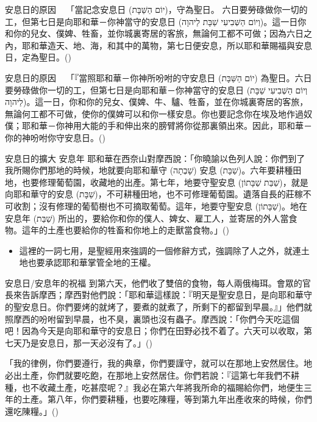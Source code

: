 \documentclass{beamer}
\newcommand{\parvspace}{\par\vspace{0.5em}}
\begin{document}
\begin{frame}{安息日的原因 \textemdash\ }
  「當記念安息日 (\texthebrew{יוֹם הַשַּׁבָּת})，守為聖日。 六日要勞碌做你一切的工，\alert{但第七日是向耶和華－你神當守的安息日 (\texthebrew{וְיוֹם הַשְּׁבִיעִי שַׁבָּת לַיהוָה})}。這一日你和你的兒女、僕婢、牲畜，並你城裏寄居的客旅，無論何工都不可做；因為\alert{六日之內，耶和華造天、地、海，和其中的萬物，第七日便安息，所以耶和華賜福與安息日，定為聖日}。()\parvspace
\end{frame}

\begin{frame}{安息日的原因 \textemdash\ }
  「『當照耶和華－你神所吩咐的守安息日 (\texthebrew{יוֹם הַשַּׁבָּת}) 為聖日。六日要勞碌做你一切的工，\alert{但第七日是向耶和華－你神當守的安息日 (\texthebrew{וְיוֹם הַשְּׁבִיעִי שַׁבָּת לַיהוָה})}。這一日，你和你的兒女、僕婢、牛、驢、牲畜，並在你城裏寄居的客旅，無論何工都不可做，使你的僕婢可以和你一樣安息。\alert{你也要記念你在埃及地作過奴僕；耶和華－你神用大能的手和伸出來的膀臂將你從那裏領出來。因此，耶和華－你的神吩咐你守安息日}。()\parvspace
\end{frame}

\begin{frame}{安息日的擴大 \textemdash 安息年}
  耶和華在西奈山對摩西說：「你曉諭以色列人說：你們到了我所賜你們那地的時候，地就要向耶和華\alert{守 (\texthebrew{שָׁבְתָה}) 安息 (\texthebrew{שַׁבָּת})}。六年要耕種田地，也要修理葡萄園，收藏地的出產。第七年，地要守\alert{聖安息 (\texthebrew{שַׁבַּת שַׁבָּתוֹן})}，就是向耶和華守的\alert{安息 (\texthebrew{שַׁבָּת})}，不可耕種田地，也不可修理葡萄園。遺落自長的莊稼不可收割；沒有修理的葡萄樹也不可摘取葡萄。這年，地要守\alert{聖安息 (\texthebrew{שַׁבָּתוֹן})}。地在\alert{安息年 (\texthebrew{שַׁבַּת})} 所出的，要給你和你的僕人、婢女、雇工人，並寄居的外人當食物。這年的土產也要給你的牲畜和你地上的走獸當食物。」()\parvspace
  \begin{itemize}
    \item
      這裡的\alert{一詞七用}，是聖經用來強調的一個修辭方式，強調\alert{除了人之外，就連土地也要承認耶和華掌管全地的王權}。\parencite{安息年}
  \end{itemize}
\end{frame}

\begin{frame}{安息日/安息年的祝福}
  \alert{到第六天，他們收了雙倍的食物，每人兩俄梅珥}。會眾的官長來告訴摩西；摩西對他們說：「耶和華這樣說：『明天是聖安息日，是向耶和華守的聖安息日。你們要烤的就烤了，要煮的就煮了，所剩下的都留到早晨。』」他們就照摩西的吩咐留到早晨，也不臭，裏頭也沒有蟲子。摩西說：「你們今天吃這個吧！因為今天是向耶和華守的安息日；你們在田野必找不着了。六天可以收取，第七天乃是安息日，那一天必沒有了。」()\parvspace
  「我的律例，你們要遵行，我的典章，你們要謹守，就可以在那地上安然居住。地必出土產，你們就要吃飽，在那地上安然居住。你們若說：『這第七年我們不耕種，也不收藏土產，吃甚麼呢？』\alert{我必在第六年將我所命的福賜給你們，地便生三年的土產}。第八年，你們要耕種，也要吃陳糧，等到第九年出產收來的時候，你們還吃陳糧。」()\parvspace
\end{frame}
\end{document}

